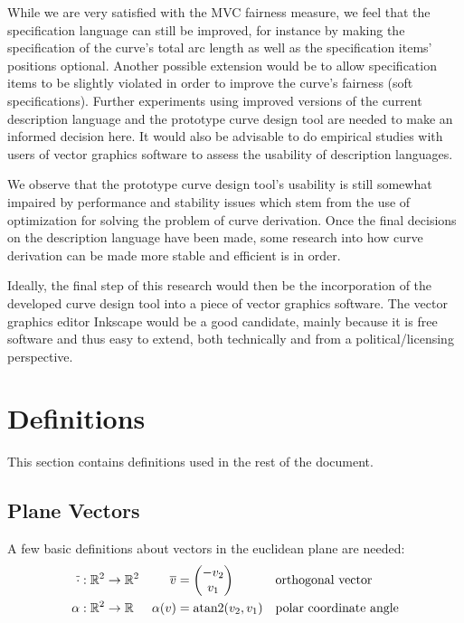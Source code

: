 \documentclass[a4paper]{article}
\begin{document}
		While we are very satisfied with the MVC fairness measure, we feel that the specification language can still be improved, for instance by making the specification of the curve's total arc length as well as the specification items' positions optional. Another possible extension would be to allow specification items to be slightly violated in order to improve the curve's fairness (soft specifications). Further experiments using improved versions of the current description language and the prototype curve design tool are needed to make an informed decision here. It would also be advisable to do empirical studies with users of vector graphics software to assess the usability of description languages.

		We observe that the prototype curve design tool's usability is still somewhat impaired by performance and stability issues which stem from the use of optimization for solving the problem of curve derivation. Once the final decisions on the description language have been made, some research into how curve derivation can be made more stable and efficient is in order.

		Ideally, the final step of this research would then be the incorporation of the developed curve design tool into a piece of vector graphics software. The vector graphics editor Inkscape would be a good candidate, mainly because it is free software and thus easy to extend, both technically and from a political/licensing perspective.

	\appendix

	\section{Definitions}
	\label{section:definitions}

		This section contains definitions used in the rest of the document.

		\subsection{Plane Vectors}
		\label{section:plane_vectors}

			A few basic definitions about vectors in the euclidean plane are needed:
			\begin{align*}
				\overline{\cdot} & : \function{\R{2}}{\R{2}} & \overline{v}      & = \vectorB{-v_2}{v_1}      && \text{orthogonal vector}\\
				\alpha           & : \function{\R{2}}{\RR}   & \apply{\alpha}{v} & = \apply{\atan2}{v_2, v_1} && \text{polar coordinate angle}
			\end{align*}
\end{document}
